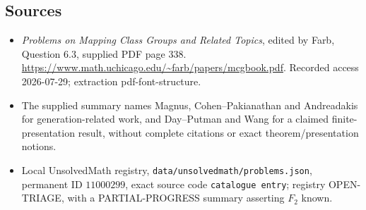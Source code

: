 \documentclass[11pt]{article}
\begin{document}
\subsection{Sources}
\begin{itemize}
\item \emph{Problems on Mapping Class Groups and Related Topics}, edited by Farb, Question 6.3, supplied PDF page 338. \url{https://www.math.uchicago.edu/~farb/papers/mcgbook.pdf}. Recorded access 2026-07-29; extraction pdf-font-structure.
\item The supplied summary names Magnus, Cohen--Pakianathan and Andreadakis for generation-related work, and Day--Putman and Wang for a claimed finite-presentation result, without complete citations or exact theorem/presentation notions.
\item Local UnsolvedMath registry, \texttt{data/unsolvedmath/problems.json}, permanent ID \(11000299\), exact source code \texttt{catalogue entry}; registry OPEN-TRIAGE, with a PARTIAL-PROGRESS summary asserting \(F_2\) known.
\end{itemize}
\end{document}
